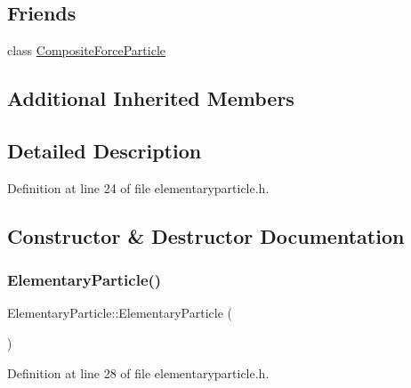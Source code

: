 \subsection*{Friends}
\begin{DoxyCompactItemize}
\item 
class \mbox{\hyperlink{class_elementary_particle_a9bc6eb2a4c20ce83728a7c9a31b91f19}{Composite\+Force\+Particle}}
\end{DoxyCompactItemize}
\subsection*{Additional Inherited Members}


\subsection{Detailed Description}


Definition at line 24 of file elementaryparticle.\+h.



\subsection{Constructor \& Destructor Documentation}
\mbox{\label{class_elementary_particle_a4035ffd6ce053ea3390632fa530c6e21}} 
\subsubsection{\texorpdfstring{Elementary\+Particle()}{ElementaryParticle()}\hspace{0.1cm}{\footnotesize\ttfamily [1/4]}}
{\footnotesize\ttfamily Elementary\+Particle\+::\+Elementary\+Particle (\begin{DoxyParamCaption}{ }\end{DoxyParamCaption})\hspace{0.3cm}{\ttfamily [inline]}}



Definition at line 28 of file elementaryparticle.\+h.

\mbox{\label{class_elementary_particle_a6bd3ad699e15769c1860e3068020a824}} 
